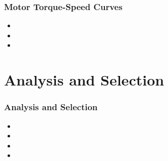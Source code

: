 \documentclass[fleqn]{beamer} %
\newcommand{\sectiontitleIII}{Motor Torque-Speed Curves}
\newcommand{\sectiontitleIV}{Analysis and Selection}
\begin{document}
	\begin{frame}[label=sectionIII] \small
		\frametitle{\sectiontitleIII}
	 		
			\begin{multicols}{2}
	 	
	        \begin{itemize}
	            \item 
	            \item 
	            \item 
	        \end{itemize}

	      
	        \end{multicols}

	    
	        
		\end{frame}  
	
\section{\sectiontitleIV}	
	    \begin{frame}[label=sectionIV] \small
		\frametitle{\sectiontitleIV}    
  
  			\begin{itemize}
	            \item 
	            \item 
	            \item 
	            \item 
	        \end{itemize}

		\end{frame}
		
\end{document}
